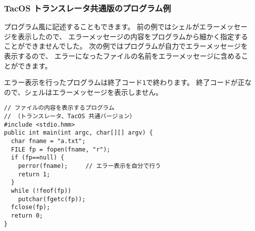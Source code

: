 \subsubsection{TacOS トランスレータ共通版のプログラム例}

\cl プログラム風に記述することもできます。
前の例ではシェルがエラーメッセージを表示したので、
エラーメッセージの内容をプログラムから細かく指定することができませんでした。
次の例ではプログラムが自力でエラーメッセージを表示するので、
エラーになったファイルの名前をエラーメッセージに含めることができます。

エラー表示を行ったプログラムは終了コード\verb/1/で終わります。
終了コードが正なので、シェルはエラーメッセージを表示しません。

\begin{mylist}
\begin{verbatim}
// ファイルの内容を表示するプログラム
// （トランスレータ、TacOS 共通バージョン）
#include <stdio.hmm>
public int main(int argc, char[][] argv) {
  char fname = "a.txt";
  FILE fp = fopen(fname, "r");
  if (fp==null) {
    perror(fname);     // エラー表示を自分で行う
    return 1;
  }
  while (!feof(fp))
    putchar(fgetc(fp));
  fclose(fp);
  return 0;
}
\end{verbatim}
\end{mylist}

